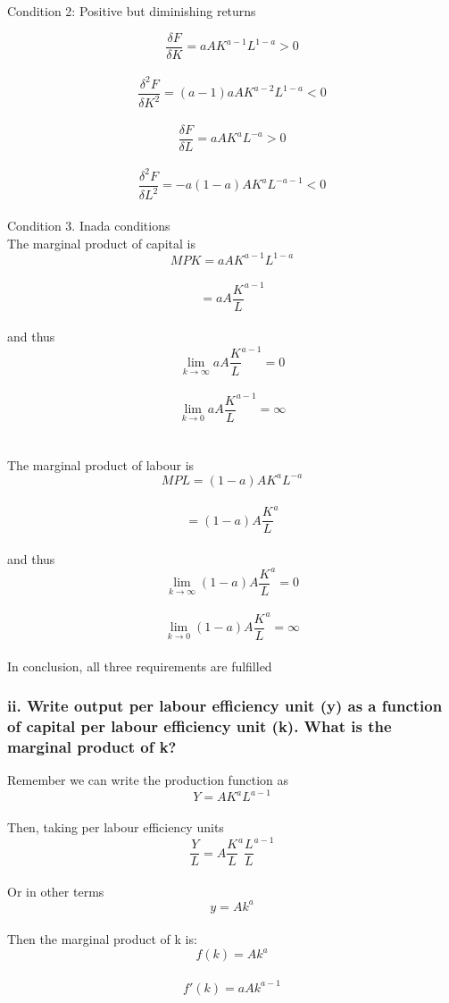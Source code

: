 \documentclass[a4paper]{article}
\begin{document}
Condition 2: Positive but diminishing returns

$$ \frac{\delta F}{\delta K} = aAK^{a-1}L^{1-a} > 0 $$ \\
$$ \frac{\delta ^2 F}{\delta K^2} = (a-1)aAK^{a-2}L^{1-a} < 0		$$ \\
$$ \frac{\delta F}{\delta L} = aAK^{a}L^{-a} > 0 $$ \\
$$ \frac{\delta ^2 F}{\delta L^2} = -a(1-a)AK^{a}L^{-a-1} < 0		$$ \\

Condition 3. Inada conditions \\
The marginal product of capital is \\
$$ MPK = aAK^{a-1}L^{1-a} $$ \\
$$ = aA\frac{K}{L}^{a-1} $$ \\
and thus
$$ \lim_{k\to\infty} aA \frac{K}{L}^{a-1} =0 $$ \\
$$ \lim_{k\to 0} aA \frac{K}{L}^{a-1} = \infty $$ \\
\\
The marginal product of labour is \\
$$ MPL = (1-a)AK^{a}L^{-a} $$ \\
$$ = (1-a)A\frac{K}{L}^{a} $$ \\
and thus
$$ \lim_{k\to\infty} (1-a)A \frac{K}{L}^{a} =0 $$ \\
$$ \lim_{k\to 0} (1-a)A \frac{K}{L}^{a} = \infty $$ \\

In conclusion, all three requirements are fulfilled

\subsubsection*{ii. Write output per labour efficiency unit (y) as a function of capital per labour
efficiency unit (k). What is the marginal product of k?}

Remember we can write the production function as \\
$$ Y=AK^a L^{a-1} $$ \\
Then, taking per labour efficiency units \\
$$ \frac{Y}{L}= A \frac{K}{L}^{a} \frac{L}{L}^{a-1} $$ \\
Or in other terms \\
$$ y=Ak^a $$ \\

Then the marginal product of k is: \\
$$ f(k)=Ak^a $$ \\
$$ f'(k)=aAk^{a-1} $$ \\
\end{document}
